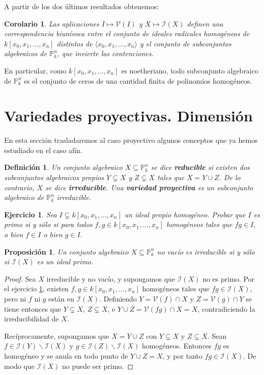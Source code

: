 \documentclass[a4paper,10pt]{book}
\newtheorem{cor}[thm]{Corolario}
\newtheorem{prop}[thm]{Proposición}
\newtheorem{defn}[thm]{Definición}
\newtheorem{ejercicio}{Ejercicio}[chapter]
\newcommand{\PP}{\mathbb P}
\newcommand{\Pnk}{\PP^n_k}
\newcommand{\II}{{\mathcal I}}
\newcommand{\VV}{{\mathcal V}}
\begin{document}
A partir de los dos últimos resultados obtenemos:

\begin{cor}
 Las aplicaciones $I\mapsto\VV(I)$ y $X\mapsto\II(X)$ definen una correspondencia biunívoca entre el conjunto de ideales radicales homogéneos de $k[x_0,x_1,\ldots,x_n]$ distintos de $\langle x_0,x_1,\ldots,x_n\rangle$ y el conjunto de subconjuntos algebraicos de $\Pnk$, que invierte las contenciones.
\end{cor}

En particular, como $k[x_0,x_1,\ldots,x_n]$ es noetheriano, todo subconjunto algebraico de $\Pnk$ es el conjunto de ceros de una cantidad finita de polinomios homogéneos. 

\section{Variedades proyectivas. Dimensión}

En esta sección trasladaremos al caso proyectivo algunos conceptos que ya hemos estudiado en el caso afín. 

\begin{defn}
 Un conjunto algebraico $X\subseteq\Pnk$ se dice {\bf reducible} si existen dos subconjuntos algebraicos propios $Y\subsetneq X$ y $Z\subsetneq X$ tales que $X=Y\cup Z$. De lo contrario, $X$ se dice {\bf irreducible}. Una {\bf variedad proyectiva} es un subconjunto algebraico de $\Pnk$ irreducible.
\end{defn}

\begin{ejercicio}\label{primohomogeneo}
 Sea $I\subsetneq k[x_0,x_1,\ldots,x_n]$ un ideal propio homogéneo. Probar que $I$ es primo si y sólo si para todos $f,g\in k[x_0,x_1,\ldots,x_n]$ \emph{homogéneos} tales que $fg\in I$, o bien $f\in I$ o bien $g\in I$.
\end{ejercicio}

 \begin{prop}
  Un conjunto algebraico $X\subseteq\Pnk$ no vacío es irreducible si y sólo si $\II(X)$ es un ideal primo.
 \end{prop}

\begin{proof}
 Sea $X$ irreducible y no vacío, y supongamos que $\II(X)$ no es primo. Por el ejercicio \ref{primohomogeneo}, existen $f,g\in k[x_0,x_1,\ldots,x_n]$ homogéneos tales que $fg\in\II(X)$, pero ni $f$ ni $g$ están en $\II(X)$. Definiendo $Y=\VV(f)\cap X$ y $Z=\VV(g)\cap Y$ se tiene entonces que $Y\subsetneq X$, $Z\subsetneq X$, e $Y\cup Z =\VV(fg)\cap X=X$, contradiciendo la irreducibilidad de $X$.

Recíprocamente, supongamos que $X=Y\cup Z$ con $Y\subsetneq X$ y $Z\subsetneq X$. Sean $f\in \II(Y)\backslash \II(X)$ y $g\in \II(Z)\backslash\II(X)$ homogéneos. Entonces $fg$ es homogéneo y se anula en todo punto de $Y\cup Z=X$, y por tanto $fg\in\II(X)$. De modo que $\II(X)$ no puede ser primo.
\end{proof}
\end{document}
